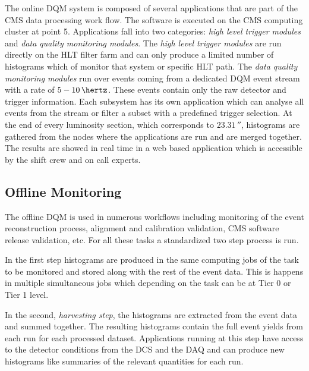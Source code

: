 
The online \gls{DQM} system is composed of several applications that are part of the \gls{CMS} data processing work flow. The software is executed on the \gls{CMS} computing cluster at point 5. Applications fall into two categories: \textit{high level trigger modules} and \textit{data quality monitoring modules}. The \textit{high level trigger modules} are run directly on the \gls{HLT} filter farm and can only produce a limited number of histograms which of monitor that system or specific \gls{HLT} path. The \textit{data quality monitoring modules} run over events coming from a dedicated \gls{DQM} event stream with a rate of $5-10\,\hertz$. These events contain only the raw detector and trigger information. Each subsystem has its own application which can analyse all events from the stream or filter a subset with a predefined trigger selection. At the end of every luminosity section, which corresponds to $23.31\,\second$, histograms are gathered from the nodes where the applications are run and are merged together. The results are showed in real time in a web based application which is accessible by the shift crew and on call experts.

\subsection{Offline Monitoring}
\label{SECTION:TechnicalWork_DataQualityMonitoring_OfflineMonitoring}


The offline \gls{DQM} is used in numerous workflows including monitoring of the event reconstruction process, alignment and calibration validation, \gls{CMS} software release validation, etc. For all these tasks a standardized two step process is run. 

In the first step histograms are produced in the same computing jobs of the task to be monitored and stored along with the rest of the event data. This is happens in multiple simultaneous jobs which depending on the task can be at Tier 0 or Tier 1 level.

In the second, \textit{harvesting step}, the histograms are extracted from the event data and summed together. The resulting histograms contain the full event yields from each run for each processed dataset. Applications running at this step have access to the detector conditions from the \gls{DCS} and the \gls{DAQ} and can produce new histograms like summaries of the relevant quantities for each run.

